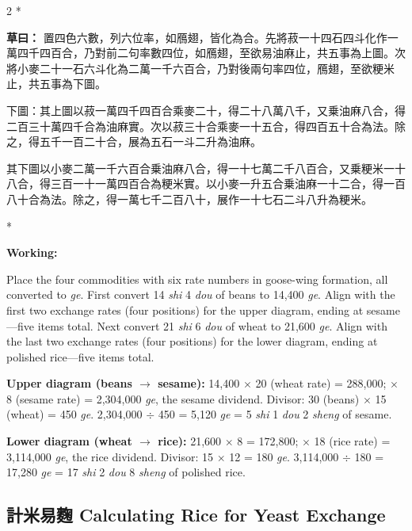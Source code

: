 \documentclass[11pt,a4paper]{article}
\newcommand{\CnWorking}[1]{\par\noindent\textbf{草曰：}#1\par\vspace{0.5ex}}
\newcommand{\EnWorking}{\par\noindent\textbf{Working:}\par\vspace{0.5ex}}
\newcommand{\switchCn}{\switchcolumn[0]*}
\newcommand{\switchEn}{\switchcolumn[1]*}
\begin{document}
\begin{paracol}{2}
\switchCn

\CnWorking{%
置四色六數，列六位率，如鴈翅，皆化為合。先將菽一十四石四斗化作一萬四千四百合，乃對前二句率數四位，如鴈翅，至欲易油麻止，共五事為上圖。次將小麥二十一石六斗化為二萬一千六百合，乃對後兩句率四位，鴈翅，至欲粳米止，共五事為下圖。

下圖：其上圖以菽一萬四千四百合乘麥二十，得二十八萬八千，又乗油麻八合，得二百三十萬四千合為油麻實。次以菽三十合乘麥一十五合，得四百五十合為法。除之，得五千一百二十合，展為五石一斗二升為油麻。

其下圖以小麥二萬一千六百合乗油麻八合，得一十七萬二千八百合，又乗粳米一十八合，得三百一十一萬四百合為粳米實。以小麥一升五合乗油麻一十二合，得一百八十合為法。除之，得一萬七千二百八十，展作一十七石二斗八升為粳米。
}

\switchEn

\EnWorking
Place the four commodities with six rate numbers in goose-wing formation, all converted to \textit{ge}. First convert 14 \textit{shi} 4 \textit{dou} of beans to 14,400 \textit{ge}. Align with the first two exchange rates (four positions) for the upper diagram, ending at sesame---five items total. Next convert 21 \textit{shi} 6 \textit{dou} of wheat to 21,600 \textit{ge}. Align with the last two exchange rates (four positions) for the lower diagram, ending at polished rice---five items total.

\textbf{Upper diagram (beans $\to$ sesame):} 14,400 $\times$ 20 (wheat rate) = 288,000; $\times$ 8 (sesame rate) = 2,304,000 \textit{ge}, the sesame dividend. Divisor: 30 (beans) $\times$ 15 (wheat) = 450 \textit{ge}. 2,304,000 $\div$ 450 = 5,120 \textit{ge} = 5 \textit{shi} 1 \textit{dou} 2 \textit{sheng} of sesame.

\textbf{Lower diagram (wheat $\to$ rice):} 21,600 $\times$ 8 = 172,800; $\times$ 18 (rice rate) = 3,114,000 \textit{ge}, the rice dividend. Divisor: 15 $\times$ 12 = 180 \textit{ge}. 3,114,000 $\div$ 180 = 17,280 \textit{ge} = 17 \textit{shi} 2 \textit{dou} 8 \textit{sheng} of polished rice.

\end{paracol}

\newpage

\subsection*{計米易麴 \quad Calculating Rice for Yeast Exchange}
\end{document}
